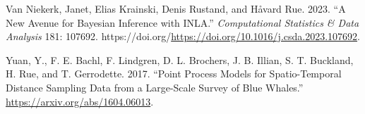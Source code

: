 \documentclass[
  a4paper,
]{article}
\newlength{\cslhangindent}
\newlength{\cslentryspacingunit} %
\newenvironment{CSLReferences}[2] %
 {%
  \setlength{\parindent}{0pt}
  \ifodd #1
  \let\oldpar\par
  \def\par{\hangindent=\cslhangindent\oldpar}
  \fi
  \setlength{\parskip}{#2\cslentryspacingunit}
 }%
 {}
\begin{document}
\begin{CSLReferences}{1}{0}
\leavevmode{}%
Van Niekerk, Janet, Elias Krainski, Denis Rustand, and Håvard Rue. 2023.
{``A New Avenue for Bayesian Inference with INLA.''} \emph{Computational
Statistics \& Data Analysis} 181: 107692.
https://doi.org/\url{https://doi.org/10.1016/j.csda.2023.107692}.

\leavevmode{}%
Yuan, Y., F. E. Bachl, F. Lindgren, D. L. Brochers, J. B. Illian, S. T.
Buckland, H. Rue, and T. Gerrodette. 2017. {``Point Process Models for
Spatio-Temporal Distance Sampling Data from a Large-Scale Survey of Blue
Whales.''} \url{https://arxiv.org/abs/1604.06013}.

\end{CSLReferences}
\end{document}

